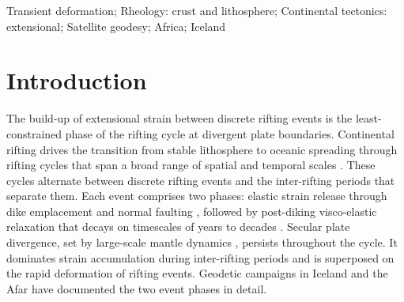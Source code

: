 \documentclass[extra]{gji}
\begin{document}
\begin{keywords}
Transient deformation; Rheology: crust and lithosphere; Continental
tectonics: extensional; Satellite geodesy; Africa; Iceland
\end{keywords}

\section{Introduction}
\label{sec:intro}

The build-up of extensional strain between discrete rifting events is the
least-constrained phase of the rifting cycle at divergent plate boundaries.
Continental rifting drives the transition from stable lithosphere to
oceanic spreading through rifting cycles that span a broad range of
spatial and temporal scales \citep{corti2009continental,ebinger2013rifting}.
These cycles alternate between discrete rifting events and the
inter-rifting periods that separate them. Each event comprises two phases: elastic strain release
through dike emplacement and normal faulting
\citep{grandin2011seismicity,maccaferri2016time}, followed by post-diking
visco-elastic relaxation that decays on timescales of years to decades
\citep{foulger1992post,nooner2009post}. Secular plate divergence, set by
large-scale mantle dynamics \citep{saria2014present,stamps2021redefining},
persists throughout the cycle. It dominates strain accumulation during
inter-rifting periods and is superposed on the rapid deformation of
rifting events. Geodetic campaigns in Iceland
\citep{heki1993plate,hofton1995horizontal} and the Afar
\citep{vigny2007twenty,nooner2009post,grandin2011seismicity} have
documented the two event phases in detail.
\end{document}
